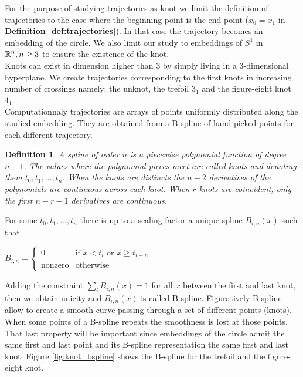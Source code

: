 \documentclass[12pt, a4paper]{article}
\newtheorem{definition}{Definition}
\begin{document}
For the purpose of studying trajectories as knot we limit the definition of trajectories to the case where the beginning point is the end point ($x_0 = x_1$ in \textbf{Definition \ref{def:trajectories}}). In that case the trajectory becomes an embedding of the circle. We also limit our study to embeddings of $S^1$ in $\mathbb{R}^n, n \ge 3$ to ensure the existence of the knot.\\ 

Knots can exist in dimension higher than $3$ by simply living in a 3-dimensional hyperplane. We create trajectories corresponding to the first knots in increasing number of crossings namely: the unknot, the trefoil $3_1$ and the figure-eight knot $4_1$.\\

Computationnaly trajectories are arrays of points uniformly distributed along the studied embedding. They are obtained from a B-spline of hand-picked points for each different trajectory.\\

\begin{definition}
  A spline of order $n$ is a piecewise polynomial function of degree $n-1$. The values where the polynomial pieces meet are called knots and denoting them $t_0,t_1, ... , t_n$. When the knots are distincts the $n-2$ derivatives of the polynomials are continuous across each knot. When $r$ knots are coincident, only the first $n-r-1$ derivatives are continuous.
\end{definition}

For some $t_0, t_1, ... , t_n$ there is up to a scaling factor a unique spline $B_{i,n}(x)$ such that

\begin{center}
  $B_{i,n} = 
  \begin{cases}
    0 &\text{if $x < t_i$ or $x \ge t_{i+n}$}\\
    \text{nonzero} & \text{otherwise}
  \end{cases}$
\end{center}

Adding the constraint $\sum\limits_i B_{i,n}(x) = 1$ for all $x$ between the first and last knot, then we obtain unicity and $B_{i,n}(x)$ is called B-spline. Figuratively B-spline allow to create a smooth curve passing through a set of different points (knots). When some points of a B-spline repeats the smoothness is lost at those points. That last property will be important since embeddings of the circle admit the same first and last point and its B-spline representation the same first and last knot. Figure \ref{fig:knot_bspline} shows the B-spline for the trefoil and the figure-eight knot. 
\end{document}
